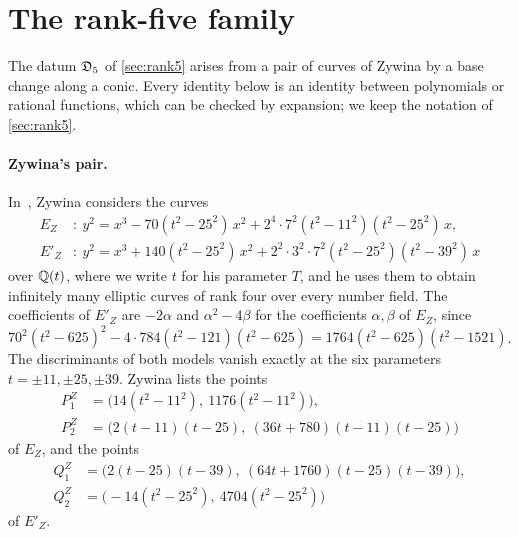 \section{The rank-five family}\label{sec:origin-r5}

The datum $\mathfrak D_5$ of \cref{sec:rank5} arises from a pair of curves of Zywina by a base change along a conic. Every identity below is an identity between polynomials or rational functions, which can be checked by expansion; we keep the notation of \cref{sec:rank5}.

\paragraph{Zywina's pair.} In~\cite[\S6.5]{Zywina2026}, Zywina considers the curves
\begin{equation}\label{r5o:zywina}
\begin{aligned}
E_Z&:\ y^2=x^3-70(t^2-25^2)\,x^2+2^4\cdot7^2(t^2-11^2)(t^2-25^2)\,x,\\
E'_Z&:\ y^2=x^3+140(t^2-25^2)\,x^2+2^2\cdot3^2\cdot7^2(t^2-25^2)(t^2-39^2)\,x
\end{aligned}
\end{equation}
over $\mathbb Q(t)$, where we write $t$ for his parameter $T$, and he uses them to obtain infinitely many elliptic curves of rank four over every number field. The coefficients of $E'_Z$ are $-2\alpha$ and $\alpha^2-4\beta$ for the coefficients $\alpha,\beta$ of $E_Z$, since $70^2(t^2-625)^2-4\cdot784(t^2-121)(t^2-625)=1764(t^2-625)(t^2-1521)$. The discriminants of both models vanish exactly at the six parameters $t=\pm11,\pm25,\pm39$. Zywina lists the points
\[
\begin{aligned}
P^Z_1&=\big(14(t^2-11^2),\ 1176(t^2-11^2)\big),\\
P^Z_2&=\big(2(t-11)(t-25),\ (36t+780)(t-11)(t-25)\big)
\end{aligned}
\]
of $E_Z$, and the points
\[
\begin{aligned}
Q^Z_1&=\big(2(t-25)(t-39),\ (64t+1760)(t-25)(t-39)\big),\\
Q^Z_2&=\big(-14(t^2-25^2),\ 4704(t^2-25^2)\big)
\end{aligned}
\]
of $E'_Z$. %

